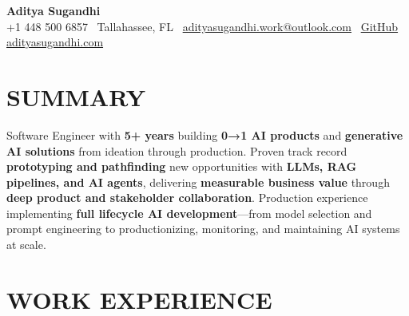 \documentclass[letterpaper,10pt]{article}
\begin{document}
\begin{center}
{\huge\textbf{Aditya Sugandhi}} \\
+1 448 500 6857 \textbar\ \textcolor{metablue}{Tallahassee, FL} \textbar\
\href{mailto:adityasugandhi.work@outlook.com}{adityasugandhi.work@outlook.com} \textbar\
\href{https://github.com/adityasugandhi}{GitHub}
\textbar \href{https://adityasugandhi.com}{adityasugandhi.com}
\end{center}
\vspace{-12pt}

\section{\textcolor{metablue}{SUMMARY}}
\small
\vspace{-6pt}
Software Engineer with \textbf{5+ years} building \textbf{0→1 AI products} and \textbf{generative AI solutions} from ideation through production. Proven track record \textbf{prototyping and pathfinding} new opportunities with \textbf{LLMs, RAG pipelines, and AI agents}, delivering \textbf{measurable business value} through \textbf{deep product and stakeholder collaboration}. Production experience implementing \textbf{full lifecycle AI development}—from model selection and prompt engineering to productionizing, monitoring, and maintaining AI systems at scale.

\vspace{-9pt}

\section{\textcolor{metablue}{WORK EXPERIENCE}}
\vspace{-12pt}
\end{document}
